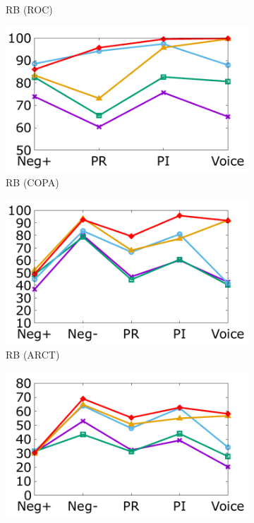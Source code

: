\begin{figure}[!th]
\begin{subfigure}[b]{0.24\textwidth}
\caption{RB (ROC)}
\label{fig:roc_roberta}
\end{subfigure}
\hfill
\begin{subfigure}[b]{0.24\textwidth}
\centering
\includegraphics[width=\columnwidth]{data/copa_roberta.pdf}
\caption{RB (COPA)}
\label{fig:copa_roberta}
\end{subfigure}
\hfill
\begin{subfigure}[b]{0.24\textwidth}
\centering
\includegraphics[width=\columnwidth]{data/arct_roberta.pdf}
\caption{RB (ARCT)}
\label{fig:arct_roberta}
\end{subfigure}
\hfill
\begin{subfigure}[b]{0.24\textwidth}
\centering
\includegraphics[width=\columnwidth]{data/reclor_roberta.pdf}

\end{subfigure}
\end{figure}
